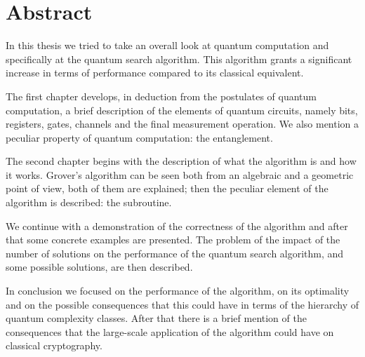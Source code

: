 \chapter{Abstract}
In this thesis we tried to take an overall look at quantum computation and specifically at the quantum search algorithm.
This algorithm grants a significant increase in terms of performance compared to its classical equivalent.

The first chapter develops, in deduction from the postulates of quantum computation, a brief description of the elements of quantum circuits, namely bits, registers, gates, channels and the final measurement operation.
We also mention a peculiar property of quantum computation: the entanglement. 

The second chapter begins with the description of what the algorithm is and how it works. Grover's algorithm can be seen both from an algebraic and a geometric point of view, both of them are explained; then the peculiar element of the algorithm is described: the subroutine.

We continue with a demonstration of the correctness of the algorithm and after that some concrete examples are presented.
The problem of the impact of the number of solutions on the performance of the quantum search algorithm, and some possible solutions, are then described.

In conclusion we focused on the performance of the algorithm, on its optimality and on the possible consequences that this could have in terms of the hierarchy of quantum complexity classes.
After that there is a brief mention of the consequences that the large-scale application of the algorithm could have on classical cryptography.